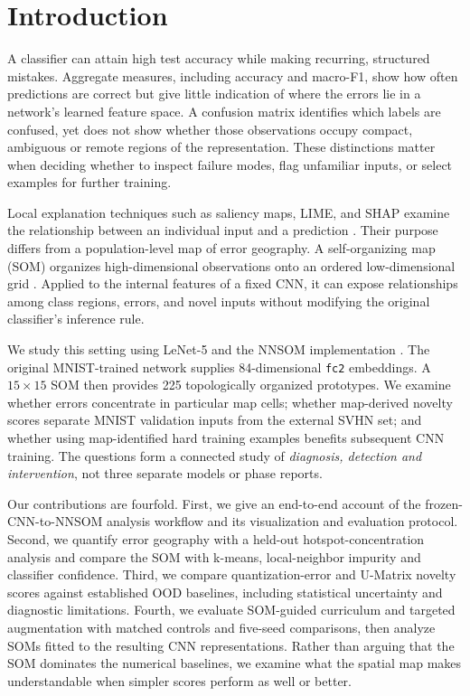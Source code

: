 \documentclass[11pt]{article}
\begin{document}
\section{Introduction}\label{sec:intro}
A classifier can attain high test accuracy while making recurring, structured mistakes. Aggregate measures, including accuracy and macro-F1, show how often predictions are correct but give little indication of where the errors lie in a network's learned feature space. A confusion matrix identifies which labels are confused, yet does not show whether those observations occupy compact, ambiguous or remote regions of the representation. These distinctions matter when deciding whether to inspect failure modes, flag unfamiliar inputs, or select examples for further training.

Local explanation techniques such as saliency maps, LIME, and SHAP examine the relationship between an individual input and a prediction \parencite{simonyan2014saliency,ribeiro2016lime,lundberg2017shap}. Their purpose differs from a population-level map of error geography. A self-organizing map (SOM) organizes high-dimensional observations onto an ordered low-dimensional grid \parencite{kohonen1990som}. Applied to the internal features of a fixed CNN, it can expose relationships among class regions, errors, and novel inputs without modifying the original classifier's inference rule.

We study this setting using LeNet-5 \parencite{lecun1998gradient} and the NNSOM implementation \parencite{jafari_nnsom}. The original MNIST-trained network supplies 84-dimensional \texttt{fc2} embeddings. A $15\times15$ SOM then provides 225 topologically organized prototypes. We examine whether errors concentrate in particular map cells; whether map-derived novelty scores separate MNIST validation inputs from the external SVHN set; and whether using map-identified hard training examples benefits subsequent CNN training. The questions form a connected study of \emph{diagnosis, detection and intervention}, not three separate models or phase reports.

Our contributions are fourfold. First, we give an end-to-end account of the frozen-CNN-to-NNSOM analysis workflow and its visualization and evaluation protocol. Second, we quantify error geography with a held-out hotspot-concentration analysis and compare the SOM with k-means, local-neighbor impurity and classifier confidence. Third, we compare quantization-error and U-Matrix novelty scores against established OOD baselines, including statistical uncertainty and diagnostic limitations. Fourth, we evaluate SOM-guided curriculum and targeted augmentation with matched controls and five-seed comparisons, then analyze SOMs fitted to the resulting CNN representations. Rather than arguing that the SOM dominates the numerical baselines, we examine what the spatial map makes understandable when simpler scores perform as well or better.
\end{document}
